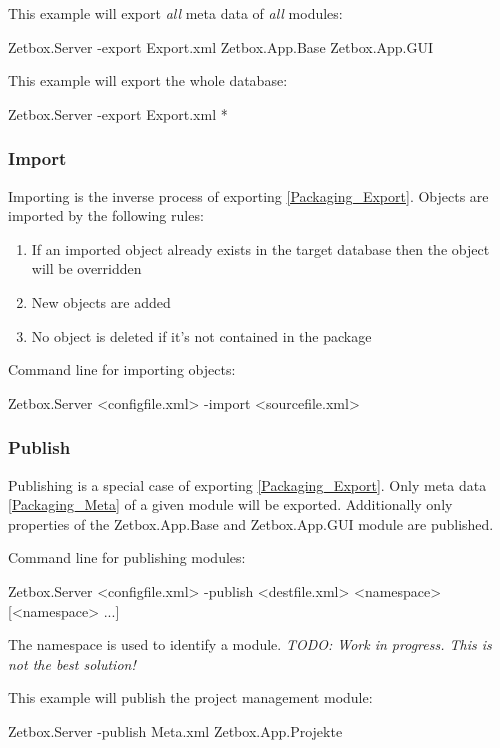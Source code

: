 This example will export \emph{all} meta data of \emph{all} modules:
\begin{CS}
Zetbox.Server -export Export.xml Zetbox.App.Base Zetbox.App.GUI
\end{CS}

This example will export the whole database:
\begin{CS}
Zetbox.Server -export Export.xml *
\end{CS}

\subsubsection{\label{Packaging_Import}Import}

Importing is the inverse process of exporting \ref{Packaging_Export}. Objects are imported by the following rules:

\begin{enumerate}
 \item If an imported object already exists in the target database then the object will be overridden
 \item New objects are added
 \item No object is deleted if it's not contained in the package
\end{enumerate}

Command line for importing objects:
\begin{CS}
Zetbox.Server <configfile.xml> -import <sourcefile.xml>
\end{CS}

\subsubsection{\label{Packaging_Publish}Publish}

Publishing is a special case of exporting \ref{Packaging_Export}. Only meta data \ref{Packaging_Meta} of a given module will be exported. 
Additionally only properties of the Zetbox.App.Base and Zetbox.App.GUI module are published.

Command line for publishing modules:
\begin{CS}
Zetbox.Server <configfile.xml> -publish <destfile.xml> <namespace> [<namespace> ...]
\end{CS}

The namespace is used to identify a module. \emph{TODO: Work in progress. This is not the best solution!}
\par

This example will publish the project management module:
\begin{CS}
Zetbox.Server -publish Meta.xml Zetbox.App.Projekte
\end{CS}

